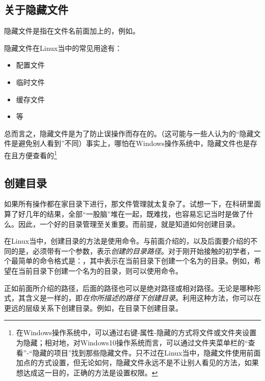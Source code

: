 \subsection{关于隐藏文件}\label{subsec:目录操作-关于隐藏文件}

\begin{extend}
    隐藏文件是指在文件名前面加上的，例如。

    隐藏文件在Linux当中的常见用途有：
    \begin{itemize}
        \item 配置文件
        \item 临时文件
        \item 缓存文件
        \item 等
    \end{itemize}

    总而言之，隐藏文件是为了防止误操作而存在的。（这可能与一些人认为的“隐藏文件是避免别人看到”不同）事实上，哪怕在Windows操作系统中，隐藏文件也是存在且方便查看的\footnote{在Windows操作系统中，可以通过右键-属性-隐藏的方式将文件或文件夹设置为隐藏；相对地，对Windows10操作系统而言，可以通过文件夹菜单栏的“查看”-“隐藏的项目”找到那些隐藏文件。只不过在Linux当中，隐藏文件使用前面加点的方式设置，但无论如何，隐藏文件永远不是不让别人看见的方法，如果想达成这一目的，正确的方法是设置权限。}
\end{extend}

\subsection{创建目录}\label{subsec:目录操作-创建目录}

如果所有操作都在家目录下进行，那文件管理就太复杂了。试想一下，在科研里面算了好几年的结果，全部“一股脑”堆在一起，既难找，也容易忘记当时是做了什么。因此，一个好的目录管理至关重要。而前提，就是知道如何创建目录。

在Linux当中，创建目录的方法是使用命令。与前面介绍的，以及后面要介绍的不同的是，必须带有一个参数，表示\emph{创建的目录路径}。对于刚开始接触的初学者，一个最简单的命令格式是：，其中表示在当前目录下创建一个名为的目录。例如，希望在当前目录下创建一个名为的目录，则可以使用命令。

正如前面所介绍的路径，后面的路径也可以是绝对路径或相对路径。无论是哪种形式，其含义是一样的，即\emph{在你所描述的路径下创建目录}。利用这种方法，你可以在更远的层级关系下创建目录。例如，在目录下创建目录。

